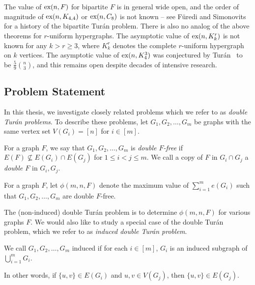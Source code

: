 The value of $\textnormal{ex}(n, F)$ for bipartite $F$ is in general wide open, and the order of magnitude of $\textnormal{ex}(n, K_{4, 4})$ or $\textnormal{ex}(n, C_8)$ is not known -- see F\"{u}redi and Simonovits~\cite{FurediSimonovits2013} for a history of the bipartite Tur\'{a}n problem. There is also no analog of the above theorems for $r$-uniform hypergraphs. The asymptotic value of $\textnormal{ex}(n, K_k^r)$ is not known for any $k > r \geq 3$, where $K_k^r$ denotes the complete $r$-uniform hypergraph on $k$ vertices. The asymptotic value of $\textnormal{ex}(n, K_4^3)$ was conjectured by Tur\'{a}n~\cite{Turan1941} to be $\frac{5}{9} \binom{n}{3}$, and this remains open despite decades of intensive research. 

\subsection{Problem Statement}

In this thesis, we investigate closely related problems which we refer to as \textit{double Tur\'{a}n problems}. To describe these problems, let $G_1, G_2, \ldots, G_m$ be graphs with the same vertex set $V(G_i) = [n]$ for $i \in [m]$. 

\begin{definition}
  For a graph $F$, we say that $G_1, G_2, \dots, G_m$ is \textit{double $F$-free} if $E(F) \not \subseteq E(G_i) \cap E(G_j)$ for $1 \leq i < j \leq m$. We call a copy of $F$ in $G_i \cap G_j$ a \textit{double $F$} in $G_i, G_j$.
\end{definition}

\begin{definition}
  For a graph $F$, let $\phi(m, n, F)$ denote the maximum value of $\sum_{i = 1}^m e(G_i)$ such that $G_1, G_2, \dots, G_m$ are double $F$-free.
\end{definition}

The (non-induced) double Tur\'{a}n problem is to determine $\phi(m, n, F)$ for various graphs $F$. We would also like to study a special case of the double Tur\'{a}n problem, which we refer to as \textit{induced double Tur\'{a}n problem}. 

\begin{definition}
  We call $G_1, G_2, \ldots, G_m$ induced if for each $i \in [m]$, $G_i$ is an induced subgraph of $\bigcup_{i = 1}^m G_i$.
\end{definition}

In other words, if $\{u,v\} \in E(G_i)$ and $u,v \in V(G_j)$, then $\{u,v\} \in E(G_j)$. 

